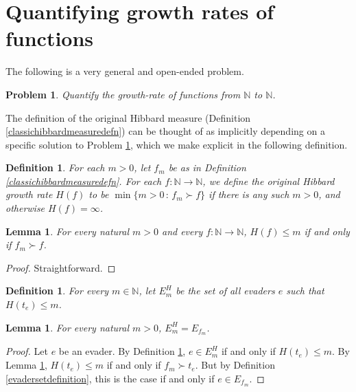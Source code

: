 \documentclass{article}
\newtheorem{definition}[theorem]{Definition}
\newtheorem{lemma}[theorem]{Lemma}
\newtheorem{problem}[theorem]{Problem}
\begin{document}
\section{Quantifying growth rates of functions}
\label{growthratesection}

The following is a very general and open-ended problem.

\begin{problem}
\label{bigoproblem}
    Quantify the growth-rate of functions from $\mathbb N$ to $\mathbb N$.
\end{problem}

The definition of the original Hibbard measure (Definition \ref{classichibbardmeasuredefn})
can be thought of as implicitly depending on a specific solution to Problem
\ref{bigoproblem}, which we make explicit in the following definition.

\begin{definition}
\label{hibbardgrowthratedefn}
    For each $m>0$, let $f_m$ be as in Definition \ref{classichibbardmeasuredefn}.
    For each $f:\mathbb N\to\mathbb N$, we define the \emph{original Hibbard growth rate}
    $H(f)$ to be $\min\{m>0\,:\,f_m\succ f\}$ if there is any such $m>0$, and otherwise
    $H(f)=\infty$.
\end{definition}

\begin{lemma}
\label{straightfwdtechnicallemma}
    For every natural $m>0$ and every $f:\mathbb N\to\mathbb N$,
    $H(f)\leq m$ if and only if $f_m\succ f$.
\end{lemma}

\begin{proof}
    Straightforward.
\end{proof}

\begin{definition}
\label{variationondefinitionofEdefn}
    For every $m\in\mathbb N$, let $E^H_m$
    be the set of all evaders $e$ such that $H(t_e)\leq m$.
\end{definition}

\begin{lemma}
\label{equivalenceoftwoevadersetslemma}
    For every natural $m>0$, $E^H_m=E_{f_m}$.
\end{lemma}

\begin{proof}
    Let $e$ be an evader. By Definition \ref{variationondefinitionofEdefn},
    $e\in E^H_m$ if and only if $H(t_e)\leq m$.
    By Lemma \ref{straightfwdtechnicallemma}, $H(t_e)\leq m$ if and only if
    $f_m\succ t_e$. But by Definition \ref{evadersetdefinition}, this is the
    case if and only if $e\in E_{f_m}$.
\end{proof}
\end{document}
